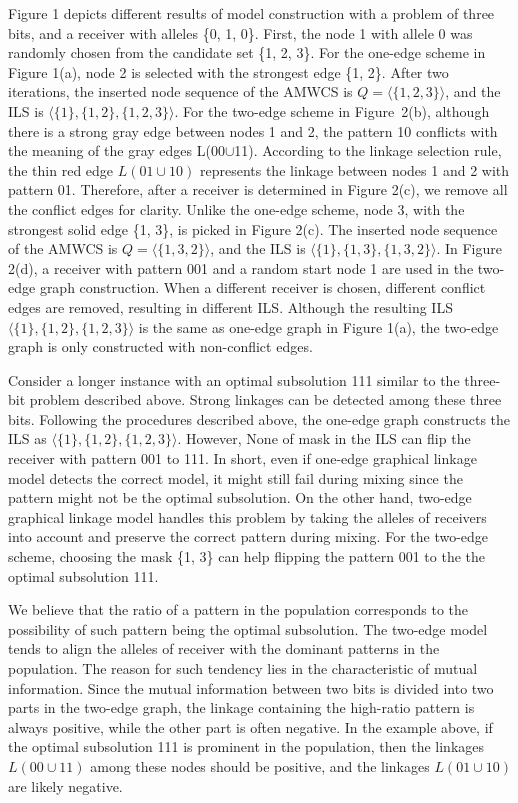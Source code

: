 \documentclass{sig-alternate-05-2015}
\begin{document}
Figure 1 depicts different results of model construction with  a problem of three bits, and a receiver with alleles \{0, 1, 0\}. First, the node 1 with allele 0 was randomly chosen from the candidate set \{1, 2, 3\}. For the one-edge scheme in Figure 1(a), node 2 is selected with the strongest edge \{1, 2\}. After two iterations, the inserted node sequence of the AMWCS  is $Q = \langle\{1, 2, 3\}\rangle$, and the ILS is  $\langle\{1\}, \{1, 2\}, \{1, 2, 3\}\rangle$. For the two-edge scheme in Figure~2(b), although there is a strong gray edge between nodes 1 and 2,  the pattern 10 conflicts with the meaning of the gray edges L(00$\cup$11). According to the linkage selection rule, the thin red edge $L(01\cup10)$ represents the linkage between nodes 1 and 2 with pattern 01. Therefore, after a receiver is determined in Figure 2(c), we remove all the conflict edges for clarity. Unlike the one-edge scheme, node 3, with the strongest solid edge \{1, 3\}, is picked in Figure 2(c). The inserted node sequence of the AMWCS is $Q = \langle\{1, 3, 2\}\rangle$,  and the ILS is $\langle\{1\}, \{1, 3\}, \{1, 3, 2\}\rangle$. In Figure 2(d), a receiver with pattern 001 and a random start node 1 are used in the two-edge graph construction. When a different receiver is chosen, different conflict edges are removed, resulting in different ILS. Although the resulting ILS  $\langle\{1\}, \{1, 2\}, \{1, 2, 3\}\rangle$ is the same as one-edge graph in Figure 1(a), the two-edge graph is only constructed with non-conflict edges. 

Consider a longer instance with an optimal subsolution 111 similar to the three-bit problem described above. Strong linkages can be detected among these three bits. Following the procedures described above, the one-edge graph constructs the ILS as $\langle\{1\}, \{1, 2\}, \{1, 2, 3\}\rangle$. However, None of mask in the ILS can flip the receiver with pattern 001 to 111. In short, even if one-edge graphical linkage model detects the correct model, it might still fail during mixing since the pattern might not be the optimal subsolution. On the other hand, two-edge graphical linkage model  handles this problem by taking the alleles of receivers into account and preserve the correct pattern during mixing. For the two-edge scheme, choosing the mask \{1, 3\} can help flipping the pattern 001 to the the optimal subsolution 111.   

We believe that the ratio of a pattern in the population corresponds to the possibility of such pattern being the optimal subsolution. The two-edge model tends to align the alleles of receiver  with the dominant patterns in the population. The reason for such tendency lies in the characteristic of mutual information. Since the mutual information between two bits is divided into two parts in the two-edge graph,  the  linkage containing the high-ratio pattern  is always positive, while the other part is often negative.  In the example above, if the optimal subsolution 111 is prominent in the population, then the linkages $L(00\cup11)$ among these nodes should be positive, and the linkages $L(01\cup10)$ are likely negative.  
\end{document}
